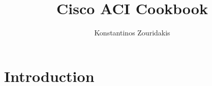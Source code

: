 \documentclass[a4paper]{article}   	%
\title{Cisco ACI Cookbook}
\author{Konstantinos Zouridakis}
\date{}
\begin{document}
\maketitle

\tableofcontents

\section{Introduction}


\end{document}
